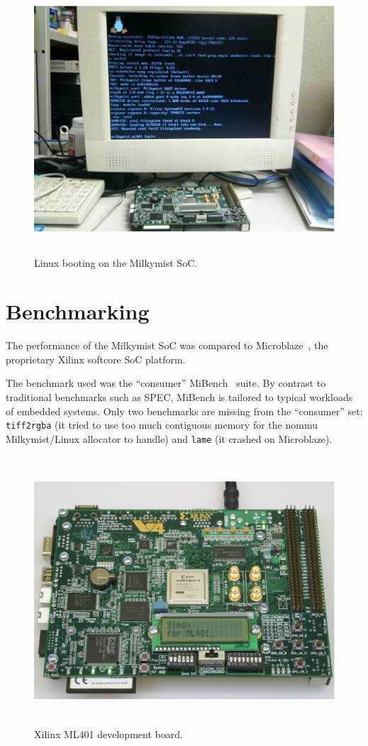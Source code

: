 \documentclass[a4paper,11pt]{kthesis}
\begin{document}
\begin{figure}[htp]
\centering
\includegraphics[height=100mm]{linux.eps}
\caption{Linux booting on the Milkymist SoC.}
\label{fig:linux}
\end{figure}

\section{Benchmarking}
The performance of the Milkymist SoC was compared to Microblaze~\cite{microblaze}, the proprietary Xilinx softcore SoC platform.

The benchmark used was the ``consumer'' MiBench~\cite{mibench} suite. By contrast to traditional benchmarks such as SPEC, MiBench is tailored to typical workloads of embedded systems. Only two benchmarks are missing from the ``consumer'' set: \verb!tiff2rgba! (it tried to use too much contiguous memory for the nommu Milkymist/Linux allocator to handle) and \verb!lame! (it crashed on Microblaze).

\begin{figure}[htp]
\centering
\includegraphics[height=100mm]{ml401.eps}
\caption{Xilinx ML401 development board.}
\label{fig:ml401}
\end{figure}
\end{document}

